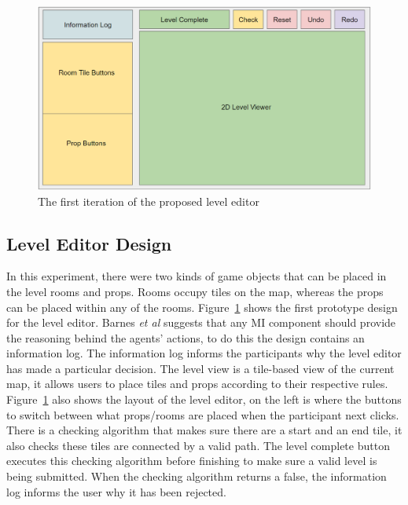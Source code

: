 \documentclass[journal]{IEEEtran}
\begin{document}
\begin{figure}[h]
	\includegraphics[width=1.0\linewidth]{LevelEditorLayout.PNG}
	\caption{The first iteration of the proposed level editor}
	\label{myLevelEditor}
\end{figure} 

\subsection{Level Editor Design}
In this experiment, there were two kinds of game objects that can be placed in the level rooms and props. Rooms occupy tiles on the map, whereas the props can be placed within any of the rooms. Figure~\ref{myLevelEditor} shows the first prototype design for the level editor. Barnes \textit{et al}\cite{barnes2015designing} suggests that any MI component should provide the reasoning behind the agents' actions, to do this the design contains an information log. The information log informs the participants why the level editor has made a particular decision. The level view is a tile-based view of the current map, it allows users to place tiles and props according to their respective rules. Figure~\ref{myLevelEditor} also shows the layout of the level editor, on the left is where the buttons to switch between what props/rooms are placed when the participant next clicks. There is a checking algorithm that makes sure there are a start and an end tile, it also checks these tiles are connected by a valid path. The level complete button executes this checking algorithm before finishing to make sure a valid level is being submitted. When the checking algorithm returns a false, the information log informs the user why it has been rejected.
\end{document}
